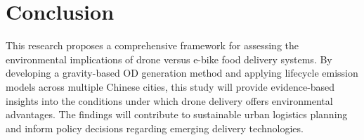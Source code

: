 \documentclass[11pt]{article}
\begin{document}

\section{Conclusion}

This research proposes a comprehensive framework for assessing the environmental implications of drone versus e-bike food delivery systems. By developing a gravity-based OD generation method and applying lifecycle emission models across multiple Chinese cities, this study will provide evidence-based insights into the conditions under which drone delivery offers environmental advantages. The findings will contribute to sustainable urban logistics planning and inform policy decisions regarding emerging delivery technologies.

\printbibliography
\end{document}

